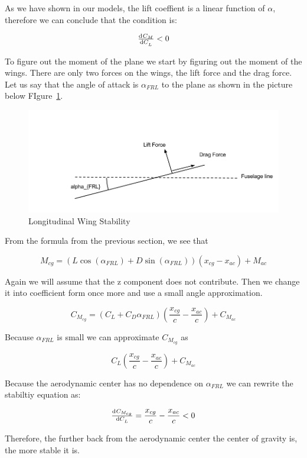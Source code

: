 As we have shown in our models, the lift coeffient is a linear function of $\alpha$, therefore
we can conclude that the condition is:

\[\od{C_M}{C_L} < 0 \]

To figure out the moment of the plane we start by figuring out the moment of the wings.
There are only two forces on the wings, the lift force and the drag force. Let us say
that the angle of attack is $\alpha_{FRL}$ to the plane as shown in the picture below 
FIgure~\ref{fig:longitudinal_stability1}.

\begin{figure}[hl]
  \centering
    \includegraphics[scale=.5]{figures/longitudinal_stability1.png}
    \caption{Longitudinal Wing Stability}
  \label{fig:longitudinal_stability1}
\end{figure}

From the formula from the previous section, we see that 

\[M_{cg}  = (L\cos(\alpha_{FRL}) + D\sin(\alpha_{FRL}))(x_{cg} - x_{ac}) + M_{ac}\]

Again we will assume that the z component does not contribute. Then we change it into
coefficient form once more and use a small angle approximation.

\[ C_{M_{cg}} = (C_{L} + C_D \alpha_{FRL}) (\frac{x_{cg}}{c} - \frac{x_{ac}}{c}) + C_{M_{ac}} \]

Because $\alpha_{FRL}$ is small we can approximate $C_{M_{cg}}$ as

\[C_L (\frac{x_{cg}}{c} - \frac{x_{ac}}{c}) + C_{M_{ac}} \]

Because the aerodynamic center has no dependence on $\alpha_{FRL}$ we can rewrite the
stabiltiy equation as:

\[\od{C_{M_{cg}}}{C_L} = \frac{x_{cg}}{c} - \frac{x_{ac}}{c} < 0\]

Therefore, the further back from the aerodynamic center the center of gravity is, the
more stable it is.
              


